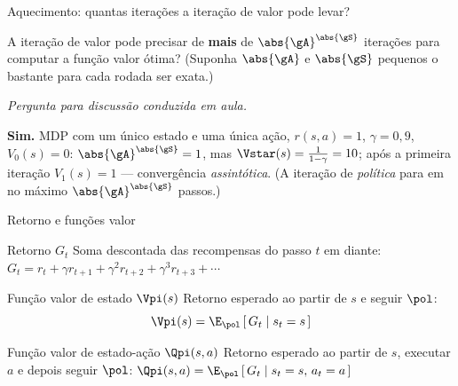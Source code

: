 \documentclass[aspectratio=169, 11pt]{beamer}
\newcommand{\paradiscussao}{\vspace{-0.2em}
  {\footnotesize\color{rlCinza}\itshape Pergunta para discussão conduzida em aula.}}
\begin{document}
\begin{frame}{Aquecimento: quantas iterações a iteração de valor pode levar?}
  \begin{quizbox}{}
    A iteração de valor pode precisar de \textbf{mais} de
    $\abs{\gA}^{\abs{\gS}}$ iterações para computar a função valor ótima?
    (Suponha $\abs{\gA}$ e $\abs{\gS}$ pequenos o bastante para cada rodada
    ser exata.)
  \end{quizbox}
  \paradiscussao

  \pause
  \begin{respbox}
    \textbf{Sim.} MDP com um único estado e uma única ação,
    $r(s,a) = 1$, $\gamma = 0{,}9$, $V_0(s) = 0$: $\abs{\gA}^{\abs{\gS}} = 1$,
    mas $\Vstar(s) = \tfrac{1}{1-\gamma} = 10$; após a primeira iteração
    $V_1(s) = 1$ — convergência \emph{assintótica}. (A iteração de
    \emph{política} para em no máximo $\abs{\gA}^{\abs{\gS}}$ passos.)
  \end{respbox}
\end{frame}

\begin{frame}{Retorno e funções valor}
  \begin{defbox}{Retorno $G_t$}
    Soma descontada das recompensas do passo $t$ em diante:
    $G_t = r_t + \gamma r_{t+1} + \gamma^2 r_{t+2} + \gamma^3 r_{t+3} + \cdots$
  \end{defbox}

  \begin{defbox}{Função valor de estado $\Vpi(s)$}
    Retorno esperado ao partir de $s$ e seguir $\pol$:
    \[ \Vpi(s) = \E_{\pol}\left[\, G_t \mid s_t = s \,\right] \]
  \end{defbox}

  \begin{defbox}{Função valor de estado-ação $\Qpi(s,a)$}
    Retorno esperado ao partir de $s$, executar $a$ e depois seguir $\pol$:
    $\Qpi(s,a) = \E_{\pol}\left[\, G_t \mid s_t = s,\, a_t = a \,\right]$
  \end{defbox}
\end{frame}
\end{document}
